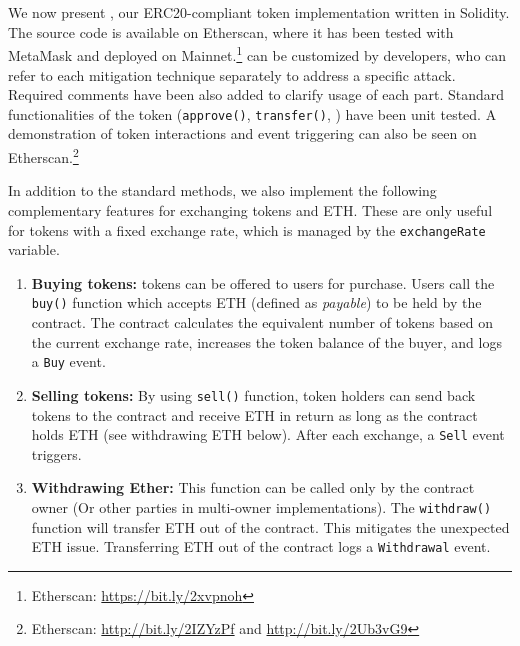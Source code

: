 
\section{\sys}\label{sec:proposal}

We now present \sys, our ERC20-compliant token implementation written in Solidity. The source code is available on Etherscan, where it has been tested with MetaMask and deployed on Mainnet.\footnote{Etherscan: \url{https://bit.ly/2xvpnoh}} \sys can be customized by developers, who can refer to each mitigation technique separately to address a specific attack. Required comments have been also added to clarify usage of each part. Standard functionalities of the token (\ie \texttt{approve()}, \texttt{transfer()}, \etc) have been unit tested. A demonstration of token interactions and event triggering can also be seen on Etherscan.\footnote{Etherscan: \url{http://bit.ly/2IZYzPf} and \url{http://bit.ly/2Ub3vG9}} 


In addition to the standard \erc methods, we also implement the following complementary features for exchanging tokens and ETH. These are only useful for tokens with a fixed exchange rate, which is managed by the \texttt{exchangeRate} variable.  

\begin{enumerate}
	\item \textbf{Buying tokens:} \erc tokens can be offered to users for purchase. Users call the \texttt{buy()} function which accepts ETH (\ie defined as \textit{payable}) to be held by the \erc contract. The contract calculates the equivalent number of tokens based on the current exchange rate, increases the token balance of the buyer, and logs a \texttt{Buy} event.
	\item \textbf{Selling tokens:} By using \texttt{sell()} function, token holders can send back tokens to the contract and receive ETH in return as long as the contract holds ETH (see withdrawing ETH below). After each exchange, a \texttt{Sell} event triggers. 
	\item \textbf{Withdrawing Ether:} This function can be called only by the contract owner {\chg (Or other parties in multi-owner implementations)}. The \texttt{withdraw()} function will transfer ETH out of the contract. This mitigates the unexpected ETH issue. Transferring ETH out of the contract logs a \texttt{Withdrawal} event.
\end{enumerate}

